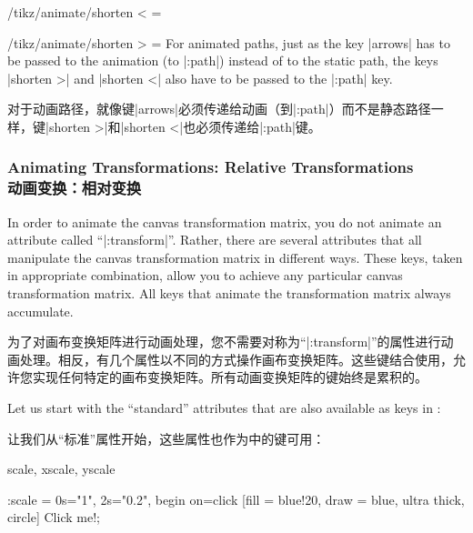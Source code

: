 \begin{key}{/tikz/animate/shorten < = }
\end{key}

\begin{key}{/tikz/animate/shorten > = }
    For animated paths, just as the key |arrows| has to be passed to the
    animation (to |:path|) instead of to the static path, the keys |shorten >|
    and |shorten <| also have to be passed to the |:path| key.

    对于动画路径，就像键|arrows|必须传递给动画（到|:path|）而不是静态路径一样，键|shorten >|和|shorten <|也必须传递给|:path|键。


\end{key}


\subsubsection{Animating Transformations: Relative Transformations\\动画变换：相对变换}

In order to animate the canvas transformation matrix, you do not animate an
attribute called ``|:transform|''. Rather, there are several attributes that
all manipulate the canvas transformation matrix in different ways. These keys,
taken in appropriate combination, allow you to achieve any particular canvas
transformation matrix. All keys that animate the transformation matrix always
accumulate.

为了对画布变换矩阵进行动画处理，您不需要对称为“|:transform|”的属性进行动画处理。相反，有几个属性以不同的方式操作画布变换矩阵。这些键结合使用，允许您实现任何特定的画布变换矩阵。所有动画变换矩阵的键始终是累积的。

Let us start with the ``standard'' attributes that are also available as keys
in \tikzname:

让我们从“标准”属性开始，这些属性也作为\tikzname 中的键可用：

\begin{tikzanimateattribute}{scale, xscale, yscale}
\begin{codeexample}[
    preamble={\usetikzlibrary{animations}},
    animation list={0.5,1,1.5,2},
]
\tikz \node :scale = { 0s="1", 2s="0.2", begin on=click}
  [fill = blue!20, draw = blue, ultra thick, circle] {Click me!};
\end{codeexample}
\end{tikzanimateattribute}

